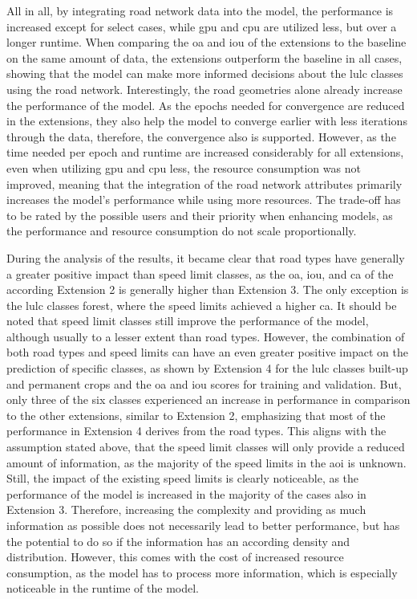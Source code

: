 All in all, by integrating road network data into the model, the performance is increased except for select cases, while \gls{gpu} and \gls{cpu} are utilized less, but over a longer runtime. When comparing the \gls{oa} and \gls{iou} of the extensions to the baseline on the same amount of data, the extensions outperform the baseline in all cases, showing that the model can make more informed decisions about the \gls{lulc} classes using the road network. Interestingly, the road geometries alone already increase the performance of the model. As the epochs needed for convergence are reduced in the extensions, they also help the model to converge earlier with less iterations through the data, therefore, the convergence also is supported. However, as the time needed per epoch and runtime are increased considerably for all extensions, even when utilizing \gls{gpu} and \gls{cpu} less, the resource consumption was not improved, meaning that the integration of the road network attributes primarily increases the model's performance while using more resources. The trade-off has to be rated by the possible users and their priority when enhancing models, as the performance and resource consumption do not scale proportionally. 

During the analysis of the results, it became clear that road types have generally a greater positive impact than speed limit classes, as the \gls{oa}, \gls{iou}, and \gls{ca} of the according Extension 2 is generally higher than Extension 3. The only exception is the \gls{lulc} classes forest, where the speed limits achieved a higher \gls{ca}. It should be noted that speed limit classes still improve the performance of the model, although usually to a lesser extent than road types. However, the combination of both road types and speed limits can have an even greater positive impact on the prediction of specific classes, as shown by Extension 4 for the \gls{lulc} classes built-up and permanent crops and the \gls{oa} and \gls{iou} scores for training and validation. But, only three of the six classes experienced an increase in performance in comparison to the other extensions, similar to Extension 2, emphasizing that most of the performance in Extension 4 derives from the road types. This aligns with the assumption stated above, that the speed limit classes will only provide a reduced amount of information, as the majority of the speed limits in the \gls{aoi} is unknown. Still, the impact of the existing speed limits is clearly noticeable, as the performance of the model is increased in the majority of the cases also in Extension 3. Therefore, increasing the complexity and providing as much information as possible does not necessarily lead to better performance, but has the potential to do so if the information has an according density and distribution. However, this comes with the cost of increased resource consumption, as the model has to process more information, which is especially noticeable in the runtime of the model.


